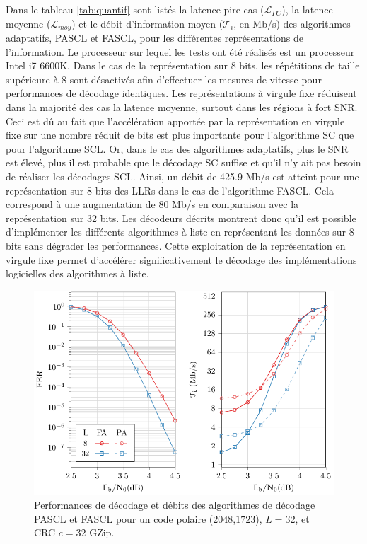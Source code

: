 Dans le tableau \ref{tab:quantif} sont listés la latence \og pire cas \fg ($\mathcal{L}_{PC}$), la latence moyenne ($\mathcal{L}_{moy}$) et le débit d'information moyen ($\mathcal{T}_i$, en Mb/s) des algorithmes adaptatifs, PASCL et FASCL, pour les différentes représentations de l'information. Le processeur sur lequel les tests ont été réalisés est un processeur Intel i7 6600K. Dans le cas de la représentation sur 8 bits, les \noeuds répétitions de taille supérieure à 8 sont désactivés afin d'effectuer les mesures de vitesse pour performances de décodage identiques. Les représentations à virgule fixe réduisent dans la majorité des cas la latence moyenne, surtout dans les régions à fort SNR. Ceci est dû au fait que l'accélération apportée par la représentation en virgule fixe sur une nombre réduit de bits est plus importante pour l'algorithme SC que pour l'algorithme SCL. Or, dans le cas des algorithmes adaptatifs, plus le SNR est élevé, plus il est probable que le décodage SC suffise et qu'il n'y ait pas besoin de réaliser les décodages SCL. Ainsi, un débit de 425.9 Mb/s est atteint pour une représentation sur 8 bits des LLRs dans le cas de l'algorithme FASCL. Cela correspond à une augmentation de 80 Mb/s en comparaison avec la représentation sur 32 bits. Les décodeurs décrits montrent donc qu'il est possible d'implémenter les différents algorithmes à liste en représentant les données sur 8 bits sans dégrader les performances. Cette exploitation de la représentation en virgule fixe permet d'accélérer significativement le décodage des  implémentations logicielles des algorithmes à liste.

\begin{figure}[t]
\includegraphics{main/ch2_fig/curves/ascl/tikz/ascl}
\caption{Performances de décodage et débits des algorithmes de décodage PASCL et FASCL pour un code polaire ($2048$,$1723$), $L=32$, et CRC $c=32$ GZip.}
\label{fig:ascl_perfs}
\end{figure}


